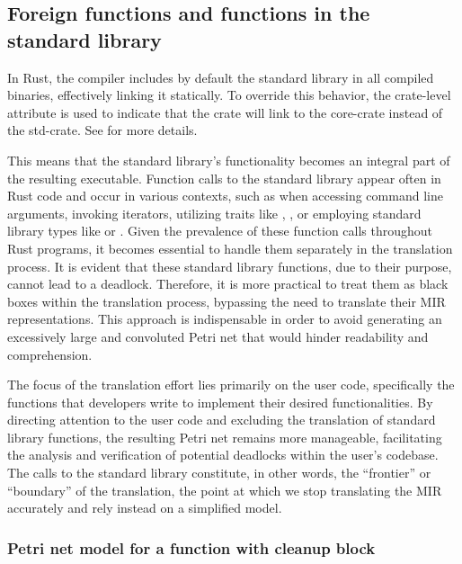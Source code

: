\subsection{Foreign functions and functions in the standard library}

In Rust, the compiler includes by default
the standard library in all compiled binaries, effectively linking it statically.
To override this behavior, the crate-level attribute \Rustinline{#![no_std]}
is used to indicate that the crate will link to the core-crate instead of the std-crate.
See \cite{embedded-book} for more details.

This means that the standard library's functionality becomes an integral part of the resulting executable.
Function calls to the standard library appear often in Rust code and occur in various contexts,
such as when accessing command line arguments, invoking iterators,
utilizing traits like , ,
or employing standard library types like  or .
Given the prevalence of these function calls throughout Rust programs,
it becomes essential to handle them separately in the translation process.
It is evident that these standard library functions, due to their purpose, cannot lead to a deadlock.
Therefore, it is more practical to treat them as black boxes within the translation process,
bypassing the need to translate their MIR representations.
This approach is indispensable in order to avoid generating
an excessively large and convoluted Petri net that would hinder readability and comprehension.

The focus of the translation effort lies primarily on the user code, specifically
the functions that developers write to implement their desired functionalities.
By directing attention to the user code and excluding the translation of standard library functions,
the resulting Petri net remains more manageable,
facilitating the analysis and verification of potential deadlocks within the user's codebase.
The calls to the standard library constitute, in other words,
the ``frontier'' or ``boundary'' of the translation,
the point at which we stop translating the \acrshort{MIR} accurately
and rely instead on a simplified model.

\subsubsection{Petri net model for a function with cleanup block}

